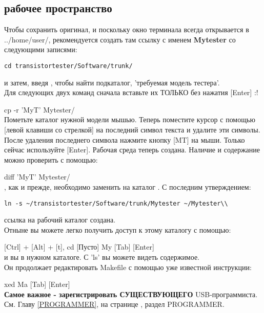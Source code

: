 \subsection{рабочее пространство}
Чтобы сохранить оригинал, и поскольку окно терминала всегда открывается в ../home/\glqq user\grqq /,
рекомендуется создать там ссылку с именем \textbf{ Mytester} со следующими записями:

\begin{large} \vspace{-0.4em} \begin{verbatim}
cd transistortester/Software/trunk/
\end{verbatim} \end{large}
и затем, введя , чтобы найти подкаталог, 'требуемая модель тестера'. \\
Для следующих двух команд сначала вставьте их ТОЛЬКО без нажатия [Enter] :!

cp -r 'MyT' Mytester/\\
Пометьте каталог нужной модели мышью. Теперь поместите курсор с помощью [левой клавиши со стрелкой] на последний
символ текста  и удалите эти символы.
После удаления последнего символа нажмите кнопку [MT] на мыши.
Только сейчас используйте [Enter]. Рабочая среда теперь создана. Наличие и содержание можно проверить с помощью:

diff 'MyT' Mytester/\\
, как и прежде, необходимо заменить на каталог . С последним утверждением:

\begin{large} \vspace{-0.4em} \begin{verbatim}
ln -s ~/transistortester/Software/trunk/Mytester ~/Mytester\\
\end{verbatim} \end{large}
ссылка на рабочий каталог создана. \\
Отныне вы можете легко получить доступ к этому каталогу с помощью:

[Ctrl] + [Alt] + [t], cd [Пусто] My [Tab] [Enter] \\
и вы в нужном каталоге. С 'ls' вы можете видеть содержимое. \\
Он продолжает редактировать Makefile с помощью уже известной инструкции:

xed Ma [Tab] [Enter]\\
\textbf{ Самое важное - зарегистрировать СУЩЕСТВУЮЩЕГО} USB-программиста.\\
См. Главу \ref{PROGRAMMER}, на странице \pageref{PROGRAMMER}, раздел PROGRAMMER. 

